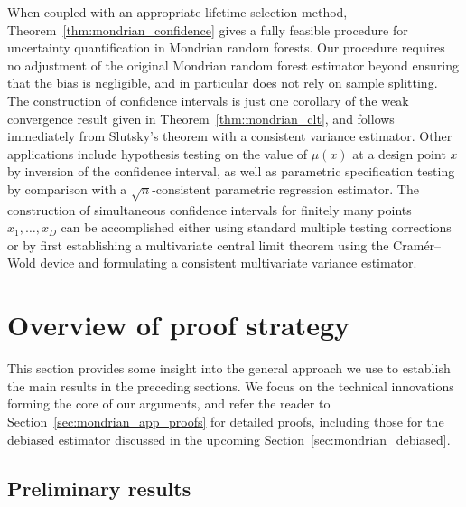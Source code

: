 \documentclass[11pt,lof]{puthesis}
\theoremstyle{break}
\theoremstyle{proof}
\begin{document}
When coupled with an appropriate lifetime selection method,
Theorem~\ref{thm:mondrian_confidence} gives a fully feasible procedure for
uncertainty quantification in Mondrian random forests. Our procedure requires no
adjustment of the original Mondrian random forest estimator beyond ensuring that
the bias is negligible, and in particular does not rely on sample splitting. The
construction of confidence intervals is just one corollary of the weak
convergence result given in Theorem~\ref{thm:mondrian_clt}, and follows
immediately from Slutsky's theorem
\citep[Chapter~7]{pollard2002user}
with a consistent variance estimator. Other applications
include hypothesis testing on the value of $\mu(x)$ at a design point $x$ by
inversion of the confidence interval, as well as parametric specification
testing by comparison with a $\sqrt{n}$-consistent parametric regression
estimator. The construction of simultaneous confidence intervals for finitely
many points $x_1, \ldots, x_D$ can be accomplished either using standard
multiple testing corrections or by first establishing a multivariate central
limit theorem using the Cram{\'e}r--Wold device
\citep[Chapter~8]{pollard2002user}
and formulating a consistent multivariate variance estimator.

\section{Overview of proof strategy}%
\label{sec:mondrian_overview_proofs}

This section provides some insight into the general approach we use to
establish the main results in the preceding sections. We focus on the technical
innovations forming the core of our arguments, and refer the reader to
Section~\ref{sec:mondrian_app_proofs} for detailed proofs, including those for
the debiased estimator discussed in the upcoming
Section~\ref{sec:mondrian_debiased}.

\subsection*{Preliminary results}
\end{document}
